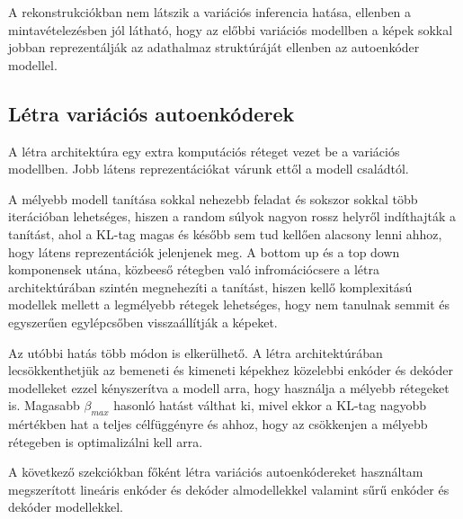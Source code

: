 \documentclass[12pt, english]{article}
\begin{document}
\vspace{4mm}

\par A rekonstrukciókban nem látszik a variációs inferencia hatása, ellenben a mintavételezésben jól látható, hogy az előbbi variációs modellben a képek sokkal jobban reprezentálják az adathalmaz struktúráját ellenben az autoenkóder modellel.

\newpage

\subsection{Létra variációs autoenkóderek}

\vspace{5mm}

\par A létra architektúra egy extra komputációs réteget vezet be a variációs modellben. Jobb látens reprezentációkat várunk ettől a modell családtól.

\vspace{4mm}

\par A mélyebb modell tanítása sokkal nehezebb feladat és sokszor sokkal több iterációban lehetséges, hiszen a random súlyok nagyon rossz helyről indíthajták a tanítást, ahol a KL-tag magas és később sem tud kellően alacsony lenni ahhoz, hogy látens reprezentációk jelenjenek meg. A bottom up és a top down komponensek utána, közbeeső rétegben való infromációcsere a létra architektúrában szintén megnehezíti a tanítást, hiszen kellő komplexitású modellek mellett a legmélyebb rétegek lehetséges, hogy nem tanulnak semmit és egyszerűen egylépcsőben visszaállítják a képeket.

\vspace{4mm}

\par Az utóbbi hatás több módon is elkerülhető. A létra architektúrában lecsökkenthetjük az bemeneti és kimeneti képekhez közelebbi enkóder és dekóder modelleket ezzel kényszerítva a modell arra, hogy használja a mélyebb rétegeket is. Magasabb $\beta_{max}$ hasonló hatást válthat ki, mivel ekkor a KL-tag nagyobb mértékben hat a teljes célfüggényre és ahhoz, hogy az csökkenjen a mélyebb rétegeben is optimalizálni kell arra.

\vspace{4mm}

\par A következő szekciókban főként létra variációs autoenkódereket használtam megszerított lineáris enkóder és dekóder almodellekkel valamint sűrű enkóder és dekóder modellekkel.
\end{document}
